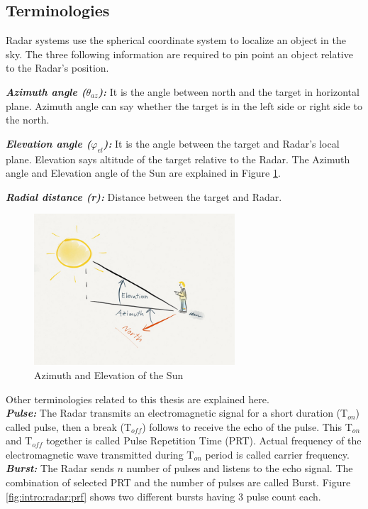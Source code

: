 \subsection{Terminologies}
Radar systems use the spherical coordinate system to localize an object in the sky. The three following information are required to pin point an object relative to the Radar's position.

\textsl{\textbf{Azimuth angle ($\theta _{az}$):}} It is the angle between north and the target in horizontal plane. Azimuth angle can say whether the target is in the left side or right side to the north.

\textsl{\textbf{Elevation angle ($\varphi _{el}$):}} It is the angle between the target and Radar's local plane. Elevation says altitude of the target relative to the Radar. The Azimuth angle and Elevation angle of the Sun are explained in Figure \ref{fig:intro:radar:aziele}.

\textsl{\textbf{Radial distance (r):}} Distance between the target and Radar.\\

\begin{figure}[h!]
	\centering
	\includegraphics[width=75mm]{figures/azimuth_elevation}
	\caption{Azimuth and Elevation of the Sun \cite{aziEle}}
	\label{fig:intro:radar:aziele}
\end{figure}
\noindent
Other terminologies related to this thesis are explained here. \\[0.4cm]
\textsl{\textbf{Pulse:}} The Radar transmits an electromagnetic signal for a short duration (T$_{on}$) called pulse, then a break (T$_{off}$) follows to receive the echo of the pulse. This T$_{on}$ and T$_{off}$ together is called Pulse Repetition Time (PRT). Actual frequency of the electromagnetic wave transmitted during T$_{on}$ period is called carrier frequency.\\[0.2cm]
\noindent
\textsl{\textbf{Burst:}} The Radar sends $n$ number of pulses and listens to the echo signal. The combination of selected PRT and the number of pulses are called Burst. Figure \ref{fig:intro:radar:prf} shows two different bursts having 3 pulse count each.

